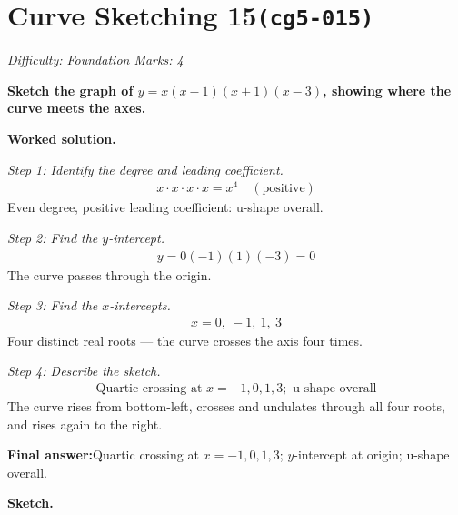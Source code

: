\documentclass[11pt]{article}
\newcommand{\question}[1]{\par\medskip\noindent\textbf{#1}\par}
\begin{document}
\section*{Curve Sketching 15\quad\small\texttt{(cg5-015)}}
\textit{Difficulty: Foundation \quad\textbar\quad Marks: 4}

\question{Sketch the graph of \( y = x(x - 1)(x + 1)(x - 3) \), showing where the curve meets the axes.}

\textbf{Worked solution.}

\textit{Step 1: Identify the degree and leading coefficient.}
\[\begin{gathered}
x \cdot x \cdot x \cdot x = x^4 \quad (\text{positive})
\end{gathered}\]
Even degree, positive leading coefficient: u-shape overall.

\textit{Step 2: Find the \( y \)-intercept.}
\[\begin{gathered}
y = 0(-1)(1)(-3) = 0
\end{gathered}\]
The curve passes through the origin.

\textit{Step 3: Find the \( x \)-intercepts.}
\[\begin{gathered}
x = 0,\ -1,\ 1,\ 3
\end{gathered}\]
Four distinct real roots --- the curve crosses the axis four times.

\textit{Step 4: Describe the sketch.}
\[\begin{gathered}
\text{Quartic crossing at } x = -1, 0, 1, 3; \text{ u-shape overall}
\end{gathered}\]
The curve rises from bottom-left, crosses and undulates through all four roots, and rises again to the right.

\begin{answerbox}
\textbf{Final answer:}\quad Quartic crossing at \(\displaystyle x = -1, 0, 1, 3\); \(\displaystyle y\)-intercept at origin; u-shape overall.
\end{answerbox}
\textbf{Sketch.}
\end{document}
